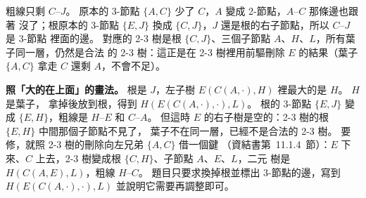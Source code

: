 \begin{pastsoln}
\begin{center}
\end{center}
粗線只剩 $C$--$J$。 原本的 3-節點 $\{A, C\}$ 少了 $C$，$A$ 變成 2-節點，$A$--$C$ 那條邊也跟著
沒了；根原本的 3-節點 $\{E, J\}$ 換成 $\{C, J\}$，$J$ 還是根的右子節點，所以 $C$--$J$ 是 3-節點
裡面的邊。 對應的 2-3 樹是根 $\{C, J\}$、三個子節點 $A$、$H$、$L$，所有葉子同一層，仍然是合法
的 2-3 樹：這正是在 2-3 樹裡用前驅刪除 $E$ 的結果（葉子 $\{A, C\}$ 拿走 $C$ 還剩 $A$，不會不足）。

\textbf{照「大的在上面」的畫法。} 根是 $J$，左子樹 $E(C(A, \cdot), H)$ 裡最大的是 $H$。 $H$ 是葉子，
拿掉後放到根，得到 $H(E(C(A, \cdot), \cdot), L)$。 根的 3-節點 $\{E, J\}$ 變成 $\{E, H\}$，粗線是
$H$--$E$ 和 $C$--$A$。 但這時 $E$ 的右子樹是空的：2-3 樹的根 $\{E, H\}$ 中間那個子節點不見了，
葉子不在同一層，已經不是合法的 2-3 樹。 要修，就照 2-3 樹的刪除向左兄弟 $\{A, C\}$ 借一個鍵
（資結書第~11.1.4~節）：$E$ 下來、$C$ 上去，2-3 樹變成根 $\{C, H\}$、子節點 $A$、$E$、$L$，二元
樹是 $H(C(A, E), L)$，粗線 $H$--$C$。 題目只要求換掉根並標出 3-節點的邊，寫到
$H(E(C(A, \cdot), \cdot), L)$ 並說明它需要再調整即可。
\end{pastsoln}

